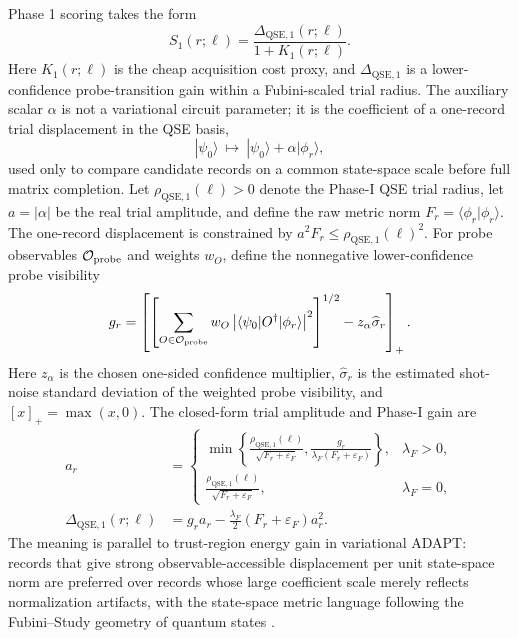 \documentclass[
  reprint,
  amsmath,
  amssymb,
  aps,
  pra,
  nofootinbib,
  superscriptaddress,
  floatfix
]{revtex4-2}
\newcommand{\Ocal}{\mathcal{O}}
\newcommand{\qse}{\mathrm{QSE}}
\newcommand{\eps}{\varepsilon}
\newcommand{\ket}[1]{|#1\rangle}
\newcommand{\bra}[1]{\langle #1|}
\newcommand{\braket}[2]{\langle #1|#2\rangle}
\begin{document}
Phase 1 scoring takes the form
\begin{equation}
S_1(r;\ell)=\frac{\Delta_{\qse,1}(r;\ell)}{1+K_1(r;\ell)}.
\label{eq:qse_phase1_score}
\end{equation}
Here $K_1(r;\ell)$ is the cheap acquisition cost proxy, and $\Delta_{\qse,1}$ is a lower-confidence probe-transition gain within a Fubini-scaled trial radius.  The auxiliary scalar $\alpha$ is not a variational circuit parameter; it is the coefficient of a one-record trial displacement in the QSE basis,
\begin{equation}
\ket{\psi_0}\ \mapsto\ \ket{\psi_0}+\alpha\ket{\phi_r},
\label{eq:qse_phase1_trial_displacement}
\end{equation}
used only to compare candidate records on a common state-space scale before full matrix completion.  Let $\rho_{\qse,1}(\ell)>0$ denote the Phase-I QSE trial radius, let $a=|\alpha|$ be the real trial amplitude, and define the raw metric norm $F_r=\braket{\phi_r}{\phi_r}$.  The one-record displacement is constrained by $a^2F_r\le \rho_{\qse,1}(\ell)^2$.  For probe observables $\Ocal_{\rm probe}$ and weights $w_O$, define the nonnegative lower-confidence probe visibility
\begin{equation}
g_r=
\left[
\left[
\sum_{O\in\Ocal_{\rm probe}}w_O
\left|
\bra{\psi_0}O^\dagger\ket{\phi_r}
\right|^2
\right]^{1/2}
-z_\alpha\widehat\sigma_r
\right]_+ .
\label{eq:qse_probe_gain}
\end{equation}
Here $z_\alpha$ is the chosen one-sided confidence multiplier, $\widehat\sigma_r$ is the estimated shot-noise standard deviation of the weighted probe visibility, and $[x]_+=\max(x,0)$.  The closed-form trial amplitude and Phase-I gain are
\begin{equation}
\begin{aligned}
a_r
&=
\begin{cases}
\displaystyle
\min\!\left\{
\frac{\rho_{\qse,1}(\ell)}{\sqrt{F_r+\eps_F}},
\frac{g_r}{\lambda_F(F_r+\eps_F)}
\right\},&\lambda_F>0,\\[2ex]
\displaystyle
\frac{\rho_{\qse,1}(\ell)}{\sqrt{F_r+\eps_F}},&\lambda_F=0,
\end{cases}
\\
\Delta_{\qse,1}(r;\ell)
&=
g_ra_r-\frac{\lambda_F}{2}(F_r+\eps_F)a_r^2 .
\end{aligned}
\label{eq:qse_phase1_gain}
\end{equation}
The meaning is parallel to trust-region energy gain in variational ADAPT: records that give strong observable-accessible displacement per unit state-space norm are preferred over records whose large coefficient scale merely reflects normalization artifacts, with the state-space metric language following the Fubini--Study geometry of quantum states \cite{ProvostVallee1980}.
\end{document}
